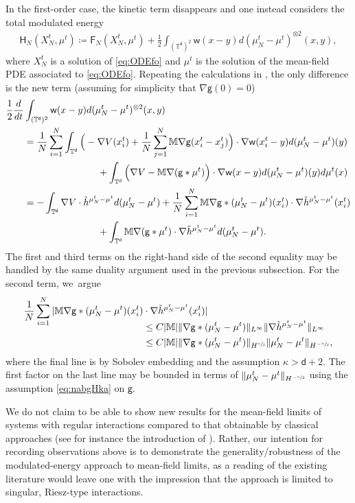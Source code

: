 \documentclass[JEP,XML,SOM,Unicode,published]{cedram}
\theoremstyle{plain}
\theoremstyle{definition}
\newcommand{\M}{{\mathbb{M}}}
\newcommand{\T}{{\mathbb{T}}}
\let\ka\kappa
\let\nab\nabla
\let\tl\tilde
\newcommand{\XN}{X_N}
\newcommand{\Fr}{\mathsf{F}}
\renewcommand{\d}{\mathsf{d}}
\newcommand{\g}{{\mathsf{g}}}
\newcommand{\w}{\mathsf{w}}
\begin{document}
In the first-order case, the kinetic term disappears and one instead considers the total modulated energy
\begin{align*}
\mathsf{H}_N(X_N^t,\mu^t) \coloneqq \Fr_N(\XN^t,\mu^t) + \frac12\int_{(\T^\d)^2}\w(x-y)d(\mu_N^t-\mu^t)^{\otimes 2}(x,y),
\end{align*}
where $X_N^t$ is a solution of \eqref{eq:ODEfo} and $\mu^t$ is the solution of the mean-field PDE associated to \eqref{eq:ODEfo}. Repeating the calculations in \cite{Serfaty2020}, the only difference is the new term (assuming for simplicity that $\nab\g(0)=0$)
\begin{align*}
\frac12\frac{d}{dt}&\int_{(\T^\d)^2}\w(x-y)d(\mu_N^t - \mu^t)^{\otimes 2}(x,y)\\
&=\frac1N\sum_{i=1}^N \int_{\T^\d}\Big(-\nab V(x_i^t) + \frac1N\sum_{j=1}^N\M\nab\g(x_i^t-x_j^t)\Big)\cdot \nab \w(x_i^t-y)d(\mu_N^t-\mu^t)(y)\\
&\hspace*{2.7cm}+ \int_{\T^\d}\Big(\nab V - \M\nab(\g\ast\mu^t)\Big)\cdot\nab\w(x-y)d(\mu_N^t-\mu^t)(y)d\mu^t(x)\\
&= -\int_{\T^\d}\nab V\cdot \tl{h}^{\mu_N^t-\mu^t}d(\mu_N^t-\mu^t) +\frac1N\sum_{i=1}^N \M\nab\g\ast(\mu_N^t-\mu^t)(x_i^t) \cdot \nab\tl{h}^{\mu_N^t-\mu^t}(x_i^t)\\
&\hspace*{2.7cm}+ \int_{\T^\d}\M\nab(\g\ast \mu^t)\cdot \nab\tl{h}^{\mu_N^t-\mu^t} d(\mu_N^t-\mu^t).
\end{align*}
The first and third terms on the right-hand side of the second equality may be handled by the same duality argument used in the previous subsection. For the second term, we~argue
\begin{align*}
\frac1N\sum_{i=1}^N |\M\nab\g\ast(\mu_N^t-\mu^t)(x_i^t) &\cdot \nab\tl{h}^{\mu_N^t-\mu^t}(x_i^t)|\\[-10pt]
&\le C|\M|\|\nab\g\ast(\mu_N^t-\mu^t)\|_{L^\infty}\|\nab\tl{h}^{\mu_N^t-\mu^t}\|_{L^\infty}\\
&\le C|\M| \|\nab\g\ast(\mu_N^t-\mu^t)\|_{H^{\sfrac\ka2}} \|\mu_N^t-\mu^t\|_{H^{-\sfrac{\ka}2}},
\end{align*}
where the final line is by Sobolev embedding and the assumption $\ka>\d+2$. The first factor on the last line may be bounded in terms of $\|\mu_N^t-\mu^t\|_{H^{-\sfrac\ka2}}$ using the assumption \eqref{eq:nabgHka} on $\g$.

{
We do not claim to be able to show new results for the mean-field limits of systems with regular interactions compared to that obtainable by classical approaches (see for instance the introduction of \cite{RS2022}). Rather, our intention for recording observations above is to demonstrate the generality/robustness of the modulated-energy approach to mean-field limits, as a reading of the existing literature would leave one with the impression that the approach is limited to singular, Riesz-type interactions.
}
\end{document}
